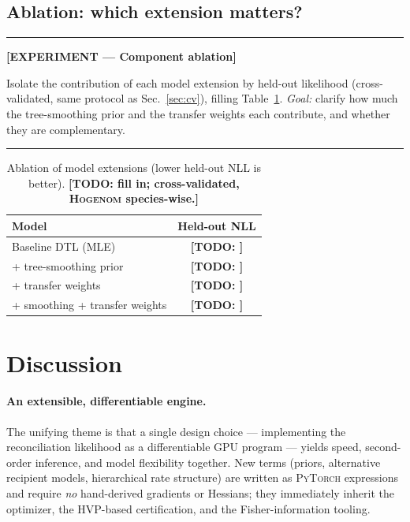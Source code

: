 \documentclass[11pt]{article}
\newenvironment{expbox}[1]{%
  \par\smallskip\noindent
  \begin{center}\begin{minipage}{0.96\linewidth}\small
  \rule{\linewidth}{0.8pt}\par
  \textbf{\color{red!60!black}[EXPERIMENT --- #1]}\par\itshape
}{%
  \par\rule{\linewidth}{0.8pt}
  \end{minipage}\end{center}\smallskip
}
\newcommand{\TODO}[1]{{\color{red!70!black}\textbf{[TODO: #1]}}}
\begin{document}
\subsection{Ablation: which extension matters?}
\label{sec:ablation}
\begin{expbox}{Component ablation}
Isolate the contribution of each model extension by held-out likelihood
(cross-validated, same protocol as Sec.~\ref{sec:cv}), filling
Table~\ref{tab:ablation}. \emph{Goal:} clarify how much the tree-smoothing prior
and the transfer weights each contribute, and whether they are complementary.
\end{expbox}
\begin{table}[t]\centering
\caption{Ablation of model extensions (lower held-out NLL is better).
\TODO{fill in; cross-validated, \textsc{Hogenom} species-wise.}}
\label{tab:ablation}
\begin{tabular}{lc}
\toprule
Model & Held-out NLL \\
\midrule
Baseline DTL (MLE)              & \TODO{} \\
\;+ tree-smoothing prior        & \TODO{} \\
\;+ transfer weights            & \TODO{} \\
\;+ smoothing + transfer weights & \TODO{} \\
\bottomrule
\end{tabular}
\end{table}

\section{Discussion}
\label{sec:discussion}

\paragraph{An extensible, differentiable engine.} The unifying theme is that a
single design choice --- implementing the reconciliation likelihood as a
differentiable GPU program --- yields speed, second-order inference, and model
flexibility together. New terms (priors, alternative recipient models,
hierarchical rate structure) are written as \textsc{PyTorch} expressions and
require \emph{no} hand-derived gradients or Hessians; they immediately inherit
the optimizer, the HVP-based certification, and the Fisher-information tooling.
\end{document}

